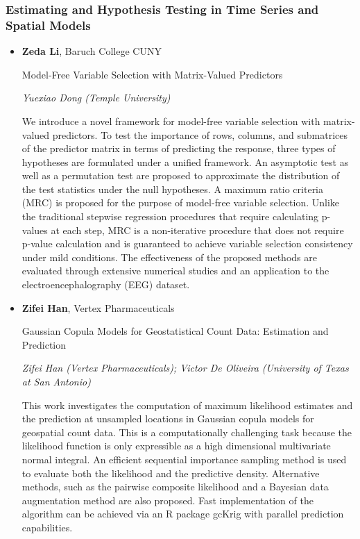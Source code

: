\subsubsection*{Estimating and Hypothesis Testing in Time Series and Spatial Models}

\begin{itemize}
\item \textbf{Zeda Li}, Baruch College CUNY

Model-Free Variable Selection with Matrix-Valued Predictors

\emph{\footnotesize Yuexiao Dong (Temple University)}

We introduce a novel framework for model-free variable selection with matrix-valued predictors. To test the importance of rows, columns, and submatrices of the predictor matrix in terms of predicting the response, three types of hypotheses are formulated under a unified framework. An asymptotic test as well as a permutation test are proposed to approximate the distribution of the test statistics under the null hypotheses. A maximum ratio criteria (MRC) is proposed for the purpose of model-free variable selection. Unlike the traditional stepwise regression procedures that require calculating p-values at each step, MRC is a non-iterative procedure that does not require p-value calculation and is guaranteed to achieve variable selection consistency under mild conditions. The effectiveness of the proposed methods are evaluated through extensive numerical studies and an application to the electroencephalography (EEG) dataset.

\item \textbf{Zifei Han}, Vertex Pharmaceuticals

Gaussian Copula Models for Geostatistical Count Data: Estimation and Prediction

\emph{\footnotesize Zifei Han (Vertex Pharmaceuticals); Victor De Oliveira (University of Texas at San Antonio)}

This work investigates the computation of maximum likelihood estimates and the prediction at unsampled locations in Gaussian copula models for geospatial count data. This is a computationally challenging task because the likelihood function is only expressible as a high dimensional multivariate normal integral. An efficient sequential importance sampling method is used to evaluate both the likelihood and the predictive density. Alternative methods, such as the pairwise composite likelihood and a Bayesian data augmentation method are also proposed. Fast implementation of the algorithm can be achieved via an R package gcKrig with parallel prediction capabilities.


\end{itemize}
